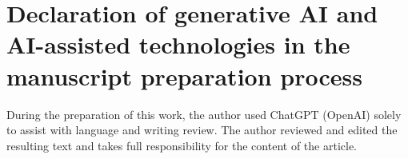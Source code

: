 \section*{Declaration of generative AI and AI-assisted technologies in the manuscript preparation process}

During the preparation of this work, the author used ChatGPT (OpenAI) solely to assist with language and writing review. The author reviewed and edited the resulting text and takes full responsibility for the content of the article.
